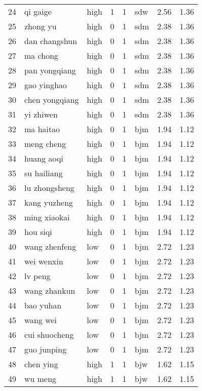 \begin{table}[ht]
\begin{tabular}{rllrrlrr}
  24 & qi gaige & high &   1 &   1 & sdw & 2.56 & 1.36 \\ 
  25 & zhong yu & high &   0 &   1 & sdm & 2.38 & 1.36 \\ 
  26 & dan changshun & high &   0 &   1 & sdm & 2.38 & 1.36 \\ 
  27 & ma chong & high &   0 &   1 & sdm & 2.38 & 1.36 \\ 
  28 & pan yongqiang & high &   0 &   1 & sdm & 2.38 & 1.36 \\ 
  29 & gao yinghao & high &   0 &   1 & sdm & 2.38 & 1.36 \\ 
  30 & chen yongqiang & high &   0 &   1 & sdm & 2.38 & 1.36 \\ 
  31 & yi zhiwen & high &   0 &   1 & sdm & 2.38 & 1.36 \\ 
  32 & ma haitao & high &   0 &   1 & bjm & 1.94 & 1.12 \\ 
  33 & meng cheng & high &   0 &   1 & bjm & 1.94 & 1.12 \\ 
  34 & huang aoqi & high &   0 &   1 & bjm & 1.94 & 1.12 \\ 
  35 & su hailiang & high &   0 &   1 & bjm & 1.94 & 1.12 \\ 
  36 & lu zhongsheng & high &   0 &   1 & bjm & 1.94 & 1.12 \\ 
  37 & kang yuzheng & high &   0 &   1 & bjm & 1.94 & 1.12 \\ 
  38 & ming xiaokai & high &   0 &   1 & bjm & 1.94 & 1.12 \\ 
  39 & hou siqi & high &   0 &   1 & bjm & 1.94 & 1.12 \\ 
  40 & wang zhenfeng & low &   0 &   1 & bjm & 2.72 & 1.23 \\ 
  41 & wei wenxin & low &   0 &   1 & bjm & 2.72 & 1.23 \\ 
  42 & lv peng & low &   0 &   1 & bjm & 2.72 & 1.23 \\ 
  43 & wang zhankun & low &   0 &   1 & bjm & 2.72 & 1.23 \\ 
  44 & bao yuhan & low &   0 &   1 & bjm & 2.72 & 1.23 \\ 
  45 & wang wei & low &   0 &   1 & bjm & 2.72 & 1.23 \\ 
  46 & cui shuocheng & low &   0 &   1 & bjm & 2.72 & 1.23 \\ 
  47 & guo junping & low &   0 &   1 & bjm & 2.72 & 1.23 \\ 
  48 & chen ying & high &   1 &   1 & bjw & 1.62 & 1.15 \\ 
  49 & wu meng & high &   1 &   1 & bjw & 1.62 & 1.15 \\ 

\end{tabular}
\end{table}
